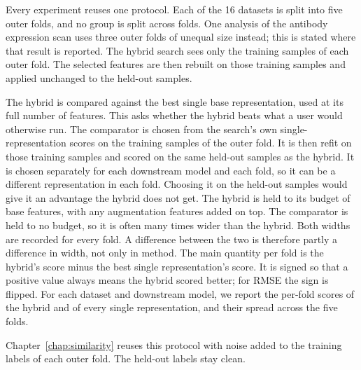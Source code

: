 Every experiment reuses one protocol. Each of the 16 datasets is split into five outer folds, and no group is split across folds. One analysis of the antibody expression scan uses three outer folds of unequal size instead; this is stated where that result is reported. The hybrid search sees only the training samples of each outer fold. The selected features are then rebuilt on those training samples and applied unchanged to the held-out samples.

The hybrid is compared against the best single base representation, used at its full number of features. This asks whether the hybrid beats what a user would otherwise run. The comparator is chosen from the search's own single-representation scores on the training samples of the outer fold. It is then refit on those training samples and scored on the same held-out samples as the hybrid. It is chosen separately for each downstream model and each fold, so it can be a different representation in each fold. Choosing it on the held-out samples would give it an advantage the hybrid does not get. The hybrid is held to its budget of base features, with any augmentation features added on top. The comparator is held to no budget, so it is often many times wider than the hybrid. Both widths are recorded for every fold. A difference between the two is therefore partly a difference in width, not only in method. The main quantity per fold is the hybrid's score minus the best single representation's score. It is signed so that a positive value always means the hybrid scored better; for RMSE the sign is flipped. For each dataset and downstream model, we report the per-fold scores of the hybrid and of every single representation, and their spread across the five folds.

Chapter~\ref{chap:similarity} reuses this protocol with noise added to the training labels of each outer fold. The held-out labels stay clean.



